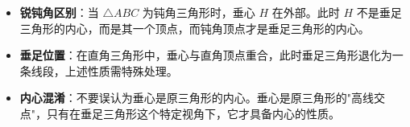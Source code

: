 \begin{trapbox}
\begin{itemize}
    \item \textbf{锐钝角区别}：当 $\triangle ABC$ 为钝角三角形时，垂心 $H$ 在外部。此时 $H$ 不是垂足三角形的内心，而是其一个顶点，而钝角顶点才是垂足三角形的内心。
    \item \textbf{垂足位置}：在直角三角形中，垂心与直角顶点重合，此时垂足三角形退化为一条线段，上述性质需特殊处理。
    \item \textbf{内心混淆}：不要误认为垂心是原三角形的内心。垂心是原三角形的"高线交点"，只有在垂足三角形这个特定视角下，它才具备内心的性质。
\end{itemize}
\end{trapbox}